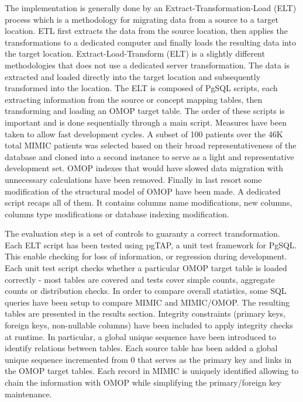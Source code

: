 The implementation is generally done by an Extract-Transformation-Load (ELT)
process which is a methodology for migrating data from a source to a target
location. ETL first extracts the data from the source location, then applies
the transformations to a dedicated computer and finally loads the resulting
data into the target location. Extract-Load-Transform (ELT) is a slightly
different methodologies that does not use a dedicated server transformation.
The data is extracted and loaded directly into the target location and
subsequently transformed into the location. The ELT is composed of PgSQL
scripts, each extracting information from the source or concept mapping tables,
then transforming and loading an OMOP target table. The order of these scripts
is important and is done sequentially through a main script.
Measures have been taken to allow fast development cycles. A subset of 100
patients over the 46K total MIMIC patients was selected based on their broad
representativeness of the database and cloned into a second instance to serve
as a light and representative development set. OMOP indexes that would have
slowed data migration with unnecessary calculations have been removed.
Finally in last resort some modification of the structural model of OMOP have
been made. A dedicated script recaps all of them. It contains columns name
modifications, new columns, columns type modifications or database indexing
modification.

The evaluation step is a set of controls to guaranty a correct transformation.
Each ELT script has been tested using pgTAP, a unit test framework for PgSQL.
This enable checking for loss of information, or regression during development.
Each unit test script checks whether a particular OMOP target table is loaded
correctly - most tables are covered and tests cover simple counts, aggregate
counts or distribution checks.
In order to compare overall statistics, some SQL queries have been setup to
compare MIMIC and MIMIC/OMOP. The resulting tables are presented in the results
section. Integrity constraints (primary keys, foreign keys, non-nullable
columns) have been included to apply integrity checks at runtime. 
In particular, a global unique sequence have been introduced to identify
relations between tables. Each source table has been added a global unique
sequence incremented from 0 that serves as the primary key and links in the
OMOP target tables. Each record in MIMIC is uniquely identified allowing to
chain the information with OMOP while simplifying the primary/foreign key
maintenance.
\\


